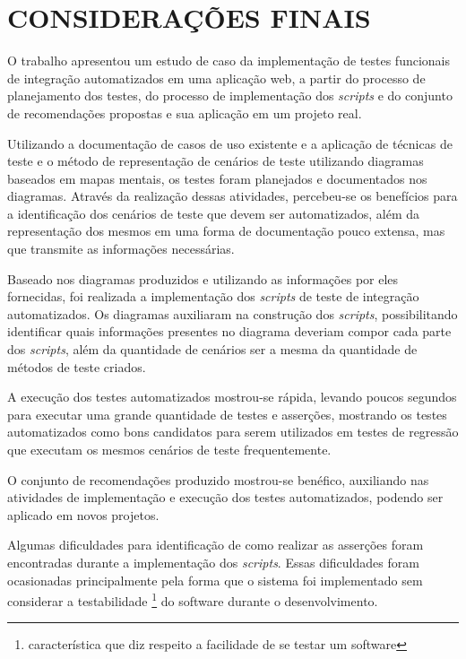 
\chapter{CONSIDERAÇÕES FINAIS}
\label{chap:conclusao}

    O trabalho apresentou um estudo de caso da implementação de testes funcionais de integração automatizados em uma aplicação web, a partir do processo de planejamento dos testes, do processo de implementação dos \emph{scripts} e do conjunto de recomendações propostas e sua aplicação em um projeto real.
    
    Utilizando a documentação de casos de uso existente e a aplicação de técnicas de teste e o método de representação de cenários de teste utilizando diagramas baseados em mapas mentais, os testes foram planejados e documentados nos diagramas. Através da realização dessas atividades, percebeu-se os benefícios para a identificação dos cenários de teste que devem ser automatizados, além da representação dos mesmos em uma forma de documentação pouco extensa, mas que transmite as informações necessárias.
    
    Baseado nos diagramas produzidos e utilizando as informações por eles fornecidas, foi realizada a implementação dos \emph{scripts} de teste de integração automatizados. Os diagramas auxiliaram na construção dos \emph{scripts}, possibilitando identificar quais informações presentes no diagrama deveriam compor cada parte dos \emph{scripts}, além da quantidade de cenários ser a mesma da quantidade de métodos de teste criados.
    
    A execução dos testes automatizados mostrou-se rápida, levando poucos segundos para executar uma grande quantidade de testes e asserções, mostrando os testes automatizados como bons candidatos para serem utilizados em testes de regressão que executam os mesmos cenários de teste frequentemente.
    
    O conjunto de recomendações produzido mostrou-se benéfico, auxiliando nas atividades de implementação e execução dos testes automatizados, podendo ser aplicado em novos projetos.
    
    Algumas dificuldades para identificação de como realizar as asserções foram encontradas durante a implementação dos \emph{scripts}. Essas dificuldades foram ocasionadas principalmente pela forma que o sistema foi implementado sem considerar a testabilidade \footnote{característica que diz respeito a facilidade de se testar um software} do software durante o desenvolvimento.
    
